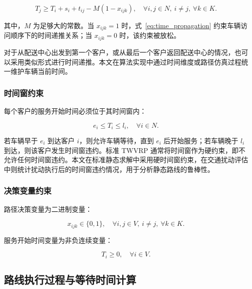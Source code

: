 \documentclass[12pt,a4paper,UTF8]{article}
\begin{document}
\begin{equation}
    T_j
    \geq
    T_i+s_i+t_{ij}
    -M(1-x_{ijk}),
    \quad \forall i,j\in N,\ i\ne j,\ \forall k\in K.
    \label{eq:time_propagation}
\end{equation}

其中，$M$ 为足够大的常数。当 $x_{ijk}=1$ 时，式~\eqref{eq:time_propagation} 约束车辆访问顺序下的时间递推关系；当 $x_{ijk}=0$ 时，该约束被放松。

对于从配送中心出发到第一个客户，或从最后一个客户返回配送中心的情况，也可以采用类似形式进行时间递推。本文在算法实现中通过时间维度或路径仿真过程统一维护车辆当前时间。

\subsubsection{时间窗约束}

每个客户的服务开始时间必须位于其时间窗内：

\begin{equation}
    e_i \leq T_i \leq l_i,
    \quad \forall i\in N.
    \label{eq:time_window_constraint}
\end{equation}

若车辆早于 $e_i$ 到达客户 $i$，则允许车辆等待，直到 $e_i$ 后开始服务；若车辆晚于 $l_i$ 到达，则该客户发生时间窗违约。标准 TWVRP 通常将时间窗作为硬约束，即不允许任何时间窗违约。本文在标准静态求解中采用硬时间窗约束，在交通扰动评估中则统计扰动执行后的时间窗违约情况，用于分析静态路线的鲁棒性。

\subsubsection{决策变量约束}

路径决策变量为二进制变量：

\begin{equation}
    x_{ijk}\in\{0,1\},
    \quad \forall i,j\in V,\ i\ne j,\ \forall k\in K.
    \label{eq:binary_constraint}
\end{equation}

服务开始时间变量为非负连续变量：

\begin{equation}
    T_i\geq 0,
    \quad \forall i\in V.
    \label{eq:time_nonnegative}
\end{equation}

\subsection{路线执行过程与等待时间计算}
\end{document}
